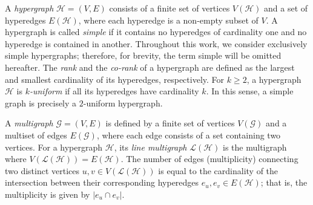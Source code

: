 \documentclass[12pt,reqno]{amsart}
\begin{document}
\begin{definition}
A \textit{hypergraph} $\mathcal{H}=(V,E)$ consists of a finite set of vertices $V(\mathcal{H})$ and a set of hyperedges $E(\mathcal{H})$, where each hyperedge is a non-empty subset of $V$. A hypergraph is called \textit{simple} if it contains no hyperedges of cardinality one and no hyperedge is contained in another. Throughout this work, we consider exclusively simple hypergraphs; therefore, for brevity, the term simple will be omitted hereafter. The \textit{rank} and the \textit{co-rank} of a hypergraph are defined as the largest and smallest cardinality of its hyperedges, respectively. For $k \ge 2$, a hypergraph $\mathcal{H}$ is \textit{$k$-uniform} if all its hyperedges have cardinality $k$. In this sense, a simple graph is precisely a $2$-uniform hypergraph.
\end{definition}


\begin{definition}
A \textit{multigraph} $\mathcal{G}=(V,E)$ is defined by a finite set of vertices $V(\mathcal{G})$ and a multiset of edges $E(\mathcal{G})$, where each edge consists of a set containing two vertices. For a hypergraph $\mathcal{H}$, its \textit{line multigraph} $\mathcal{L}(\mathcal{H})$ is the multigraph where $V(\mathcal{L}(\mathcal{H}))=E(\mathcal{H})$. The number of edges (multiplicity) connecting two distinct vertices $u, v \in V(\mathcal{L}(\mathcal{H}))$ is equal to the cardinality of the intersection between their corresponding hyperedges $e_u, e_v \in E(\mathcal{H})$; that is, the multiplicity is given by $|e_u \cap e_v|$.
\end{definition}
\end{document}
